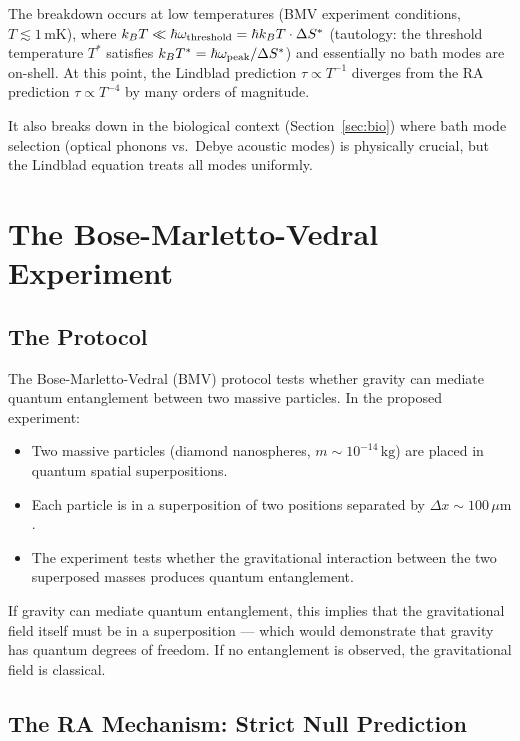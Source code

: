 \documentclass[12pt,a4paper]{article}
\begin{document}
The breakdown occurs at low temperatures (BMV experiment conditions, $T\lesssim1\,\mathrm{mK}$), where $k_BT\ll\hbar\omega_{\rm threshold}=\hbar k_B T\cdot\Delta S^*$ (tautology: the threshold temperature $T^*$ satisfies $k_BT^*=\hbar\omega_{\rm peak}/\Delta S^*$) and essentially no bath modes are on-shell.  At this point, the Lindblad prediction $\tau\propto T^{-1}$ diverges from the RA prediction $\tau\propto T^{-4}$ by many orders of magnitude.

It also breaks down in the biological context (Section~\ref{sec:bio}) where bath mode selection (optical phonons vs.\ Debye acoustic modes) is physically crucial, but the Lindblad equation treats all modes uniformly.


\section{The Bose-Marletto-Vedral Experiment}\label{sec:bmv}

\subsection{The Protocol}

The Bose-Marletto-Vedral (BMV) protocol \cite{Bose2017,Marletto2017} tests whether gravity can mediate quantum entanglement between two massive particles.  In the proposed experiment:
\begin{itemize}
  \item Two massive particles (diamond nanospheres, $m\sim10^{-14}\,\mathrm{kg}$) are placed in quantum spatial superpositions.
  \item Each particle is in a superposition of two positions separated by $\Delta x\sim100\,\mu\mathrm{m}$.
  \item The experiment tests whether the gravitational interaction between the two superposed masses produces quantum entanglement.
\end{itemize}
If gravity can mediate quantum entanglement, this implies that the gravitational field itself must be in a superposition --- which would demonstrate that gravity has quantum degrees of freedom.  If no entanglement is observed, the gravitational field is classical.

\subsection{The RA Mechanism: Strict Null Prediction}
\end{document}
